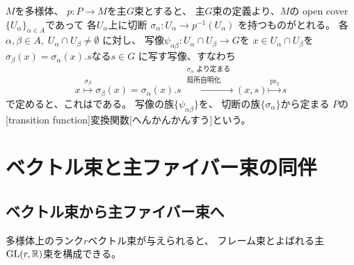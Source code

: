 \documentclass[report]{jlreq}
\begin{document}
\begin{definition}[変換関数]
    $M$を多様体、
    $p \colon P \to M$を主$G$束とすると、
    主$G$束の定義より、$M$の open cover $\{U_\alpha\}_{\alpha \in A}$であって
    各$U_\alpha$上に切断
    $\sigma_\alpha \colon U_\alpha \to p^{-1}(U_\alpha)$
    を持つものがとれる。
    各$\alpha, \beta \in A, \; U_\alpha \cap U_\beta \neq \emptyset$
    に対し、
    写像$\psi_{\alpha\beta} \colon U_\alpha \cap U_\beta \to G$を
    $x \in U_\alpha \cap U_\beta$を
    $\sigma_\beta(x) = \sigma_\alpha(x) . s$なる$s \in G$
    に写す写像、すなわち
    \begin{equation}
        x \overset{\sigma_\beta}{\mapsto} \sigma_\beta(x) = \sigma_\alpha(x) . s
            \overset{
                \substack{\sigma_\alpha \text{ より定まる} \\ \text{局所自明化}}
            }{\mapsto} (x, s)
            \overset{\mathrm{pr}_2}{\mapsto} s
    \end{equation}
    で定めると、これは{\smooth}である。
    {\smooth}写像の族$\{ \psi_{\alpha\beta} \}$を、
    切断の族$\{ \sigma_\alpha \}$から定まる
    $P$の[transition function]{変換関数}[へんかんかんすう]という。
\end{definition}

%
\section{ベクトル束と主ファイバー束の同伴}

\subsection{ベクトル束から主ファイバー束へ}

多様体上のランク$r$ベクトル束が与えられると、
フレーム束とよばれる主$\operatorname{\mathrm{GL}}(r, \mathbb{R})$束を構成できる。


\end{document}
